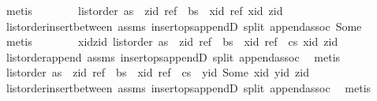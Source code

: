 \begin{isabellebody}
\ metis\isanewline
\ \ \ \ \ \ \isamarkupfalse%
\ {\isachardoublequoteopen}list{\isacharunderscore}order\ {\isacharparenleft}as\ {\isacharat}\ {\isacharbrackleft}{\isacharparenleft}zid{\isacharcomma}\ ref{\isacharparenright}{\isacharbrackright}\ {\isacharat}\ bs\ {\isacharat}\ {\isacharbrackleft}{\isacharparenleft}xid{\isacharcomma}\ ref{\isacharparenright}{\isacharbrackright}{\isacharparenright}\ xid\ zid{\isachardoublequoteclose}\isanewline
\ \ \ \ \ \ \ \ \isamarkupfalse%
\ list{\isacharunderscore}order{\isacharunderscore}insert{\isacharunderscore}between\ assms{\isacharparenleft}{}{\isacharparenright}\ insert{\isacharunderscore}ops{\isacharunderscore}appendD\ split\ append{\isachardot}assoc\ Some\ \isamarkupfalse%
\ metis\isanewline
\ \ \ \ \ \ \isamarkupfalse%
\ xid{\isacharunderscore}zid{\isacharcolon}\ {\isachardoublequoteopen}list{\isacharunderscore}order\ {\isacharparenleft}as\ {\isacharat}\ {\isacharbrackleft}{\isacharparenleft}zid{\isacharcomma}\ ref{\isacharparenright}{\isacharbrackright}\ {\isacharat}\ bs\ {\isacharat}\ {\isacharbrackleft}{\isacharparenleft}xid{\isacharcomma}\ ref{\isacharparenright}{\isacharbrackright}\ {\isacharat}\ cs{\isacharparenright}\ xid\ zid{\isachardoublequoteclose}\isanewline
\ \ \ \ \ \ \ \ \isamarkupfalse%
\ list{\isacharunderscore}order{\isacharunderscore}append\ assms{\isacharparenleft}{}{\isacharparenright}\ insert{\isacharunderscore}ops{\isacharunderscore}appendD\ split\ append{\isachardot}assoc\ \isamarkupfalse%
\ metis\isanewline
\ \ \ \ \ \ \isamarkupfalse%
\ {\isachardoublequoteopen}list{\isacharunderscore}order\ {\isacharparenleft}as\ {\isacharat}\ {\isacharbrackleft}{\isacharparenleft}zid{\isacharcomma}\ ref{\isacharparenright}{\isacharbrackright}\ {\isacharat}\ bs\ {\isacharat}\ {\isacharbrackleft}{\isacharparenleft}xid{\isacharcomma}\ ref{\isacharparenright}{\isacharbrackright}\ {\isacharat}\ cs\ {\isacharat}\ {\isacharbrackleft}{\isacharparenleft}yid{\isacharcomma}\ Some\ xid{\isacharparenright}{\isacharbrackright}{\isacharparenright}\ yid\ zid{\isachardoublequoteclose}\isanewline
\ \ \ \ \ \ \ \ \isamarkupfalse%
\ list{\isacharunderscore}order{\isacharunderscore}insert{\isacharunderscore}between\ assms{\isacharparenleft}{}{\isacharparenright}\ insert{\isacharunderscore}ops{\isacharunderscore}appendD\ split\ append{\isachardot}assoc\ \isamarkupfalse%
\ metis\isanewline
\ \ \ \ \ \ \isamarkupfalse%

\end{isabellebody}
